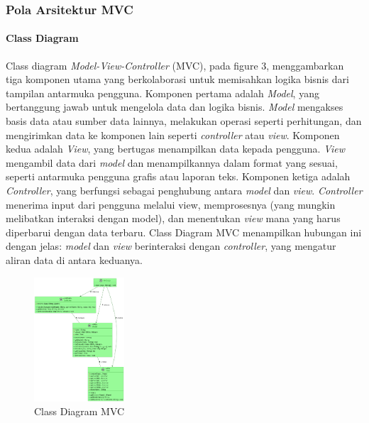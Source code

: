 \documentclass[conference]{IEEEtran}
\begin{document}
	\subsubsection{Pola Arsitektur MVC}
	\paragraph{Class Diagram}
	Class diagram \textit{Model-View-Controller} (MVC), pada figure 3, menggambarkan tiga komponen utama yang berkolaborasi untuk memisahkan logika bisnis dari tampilan antarmuka pengguna. Komponen pertama adalah \textit{Model}, yang bertanggung jawab untuk mengelola data dan logika bisnis. \textit{Model} mengakses basis data atau sumber data lainnya, melakukan operasi seperti perhitungan, dan mengirimkan data ke komponen lain seperti \textit{controller} atau \textit{view}. Komponen kedua adalah \textit{View}, yang bertugas menampilkan data kepada pengguna. \textit{View} mengambil data dari \textit{model} dan menampilkannya dalam format yang sesuai, seperti antarmuka pengguna grafis atau laporan teks. Komponen ketiga adalah \textit{Controller}, yang berfungsi sebagai penghubung antara \textit{model} dan \textit{view}. \textit{Controller} menerima input dari pengguna melalui view, memprosesnya (yang mungkin melibatkan interaksi dengan model), dan menentukan \textit{view} mana yang harus diperbarui dengan data terbaru. Class Diagram MVC menampilkan hubungan ini dengan jelas: \textit{model} dan \textit{view} berinteraksi dengan \textit{controller}, yang mengatur aliran data di antara keduanya.
	
	\begin{figure}[h]
		\centering
		\includegraphics[width=0.3\textwidth]{../Class_Sequence_Diagram/out/MVC_ClassDiagram/MVC_ClassDiagram}
		\caption{Class Diagram MVC}
		\label{fig:Class_mvc}
	\end{figure}
	
	\vspace{1cm}
	
\end{document}
